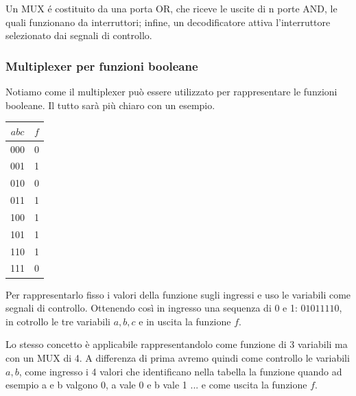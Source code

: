 Un MUX é costituito da una porta OR, che riceve le uscite di n porte AND, le quali funzionano da interruttori; infine, un decodificatore attiva l’interruttore selezionato dai segnali di controllo.

\subsubsection*{Multiplexer per funzioni booleane}
Notiamo come il multiplexer può essere utilizzato per rappresentare le funzioni booleane. Il tutto sarà più chiaro con un esempio.
\begin{example}
    \begin{table}[ht]
        \centering
        \begin{tabular}{c|c}
             $abc$ & $f$\\\hline
             000 & 0\\
             001 & 1\\
             010 & 0\\
             011 & 1\\\hline
             100 & 1\\
             101 & 1\\
             110 & 1\\
             111 & 0
        \end{tabular}
    \end{table}
    Per rappresentarlo fisso i valori della funzione sugli ingressi e uso le variabili come segnali di controllo.
    Ottenendo così in ingresso una sequenza di 0 e 1: $01011110$, in cotrollo le tre variabili $a,b,c$ e in uscita la funzione $f$.
    
    Lo stesso concetto è applicabile rappresentandolo come funzione di 3 variabili ma con un MUX di 4. A differenza di prima avremo quindi come controllo le variabili $a,b$, come ingresso i 4 valori che identificano nella tabella la funzione quando ad esempio a e b valgono 0, a vale 0 e b vale 1 ... e come uscita la funzione $f$.


\end{example}
